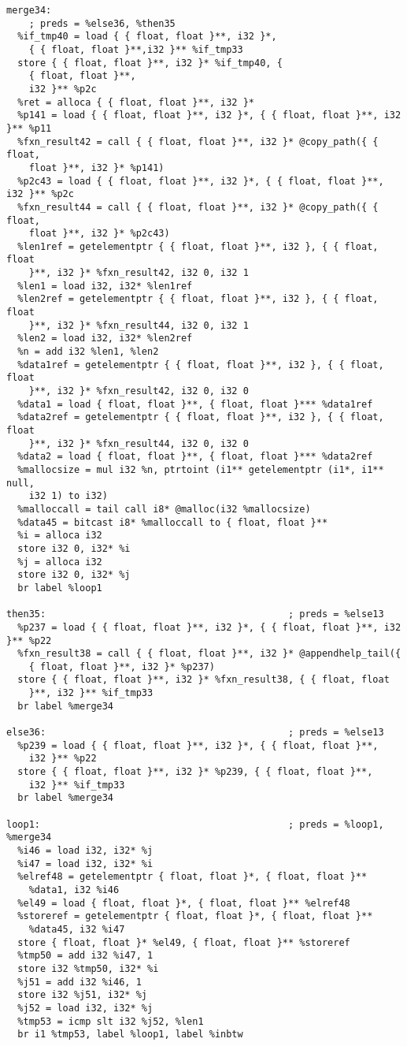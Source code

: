\documentclass[main.tex]{subfiles}
\begin{document}
{\begin{lstlisting}
merge34:                                          
    ; preds = %else36, %then35
  %if_tmp40 = load { { float, float }**, i32 }*,
    { { float, float }**,i32 }** %if_tmp33
  store { { float, float }**, i32 }* %if_tmp40, {
    { float, float }**, 
    i32 }** %p2c
  %ret = alloca { { float, float }**, i32 }*
  %p141 = load { { float, float }**, i32 }*, { { float, float }**, i32 }** %p11
  %fxn_result42 = call { { float, float }**, i32 }* @copy_path({ { float, 
    float }**, i32 }* %p141)
  %p2c43 = load { { float, float }**, i32 }*, { { float, float }**, i32 }** %p2c
  %fxn_result44 = call { { float, float }**, i32 }* @copy_path({ { float, 
    float }**, i32 }* %p2c43)
  %len1ref = getelementptr { { float, float }**, i32 }, { { float, float 
    }**, i32 }* %fxn_result42, i32 0, i32 1
  %len1 = load i32, i32* %len1ref
  %len2ref = getelementptr { { float, float }**, i32 }, { { float, float
    }**, i32 }* %fxn_result44, i32 0, i32 1
  %len2 = load i32, i32* %len2ref
  %n = add i32 %len1, %len2
  %data1ref = getelementptr { { float, float }**, i32 }, { { float, float
    }**, i32 }* %fxn_result42, i32 0, i32 0
  %data1 = load { float, float }**, { float, float }*** %data1ref
  %data2ref = getelementptr { { float, float }**, i32 }, { { float, float
    }**, i32 }* %fxn_result44, i32 0, i32 0
  %data2 = load { float, float }**, { float, float }*** %data2ref
  %mallocsize = mul i32 %n, ptrtoint (i1** getelementptr (i1*, i1** null, 
    i32 1) to i32)
  %malloccall = tail call i8* @malloc(i32 %mallocsize)
  %data45 = bitcast i8* %malloccall to { float, float }**
  %i = alloca i32
  store i32 0, i32* %i
  %j = alloca i32
  store i32 0, i32* %j
  br label %loop1

then35:                                           ; preds = %else13
  %p237 = load { { float, float }**, i32 }*, { { float, float }**, i32 }** %p22
  %fxn_result38 = call { { float, float }**, i32 }* @appendhelp_tail({
    { float, float }**, i32 }* %p237)
  store { { float, float }**, i32 }* %fxn_result38, { { float, float
    }**, i32 }** %if_tmp33
  br label %merge34

else36:                                           ; preds = %else13
  %p239 = load { { float, float }**, i32 }*, { { float, float }**,
    i32 }** %p22
  store { { float, float }**, i32 }* %p239, { { float, float }**, 
    i32 }** %if_tmp33
  br label %merge34

loop1:                                            ; preds = %loop1, %merge34
  %i46 = load i32, i32* %j
  %i47 = load i32, i32* %i
  %elref48 = getelementptr { float, float }*, { float, float }** 
    %data1, i32 %i46
  %el49 = load { float, float }*, { float, float }** %elref48
  %storeref = getelementptr { float, float }*, { float, float }**
    %data45, i32 %i47
  store { float, float }* %el49, { float, float }** %storeref
  %tmp50 = add i32 %i47, 1
  store i32 %tmp50, i32* %i
  %j51 = add i32 %i46, 1
  store i32 %j51, i32* %j
  %j52 = load i32, i32* %j
  %tmp53 = icmp slt i32 %j52, %len1
  br i1 %tmp53, label %loop1, label %inbtw


\end{lstlisting}}
\end{document}
